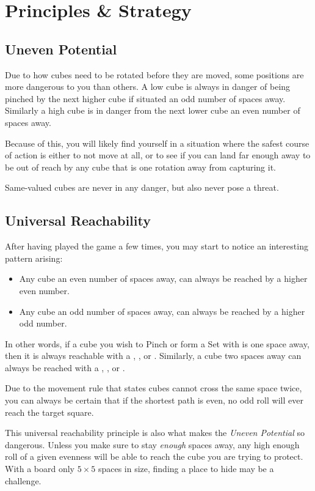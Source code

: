 \section{Principles \& Strategy}
\subsection{Uneven Potential}
Due to how cubes need to be rotated before they are moved, some positions are more dangerous to you than others. A low cube is always in danger of being pinched by the next higher cube if situated an odd number of spaces away. Similarly a high cube is in danger from the next lower cube an even number of spaces away.

Because of this, you will likely find yourself in a situation where the safest course of action is either to not move at all, or to see if you can land far enough away to be out of reach by any cube that is one rotation away from capturing it.

Same-valued cubes are never in any danger, but also never pose a threat.
\subsection{Universal Reachability}
After having played the game a few times, you may start to notice an interesting pattern arising:
\begin{itemize}
    \item Any cube an even number of spaces away, can always be reached by a higher even number.
    \item Any cube an odd number of spaces away, can always be reached by a higher odd number.
\end{itemize}
In other words, if a cube you wish to Pinch or form a Set with is one space away, then it is always reachable with a , , or .
Similarly, a cube two spaces away can always be reached with a , , or .

Due to the movement rule that states cubes cannot cross the same space twice, you can always be certain that if the shortest path is even, no odd roll will ever reach the target square.

This universal reachability principle is also what makes the \textit{Uneven Potential} so dangerous.
Unless you make sure to stay \textit{enough} spaces away, any high enough roll of a given evenness will be able to reach the cube you are trying to protect.
With a board only $5\times 5$ spaces in size, finding a place to hide may be a challenge.